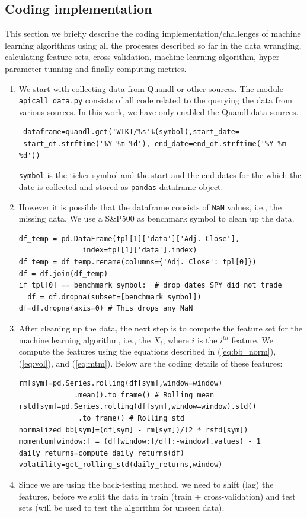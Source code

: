 \documentclass[12pt]{article}
\begin{document}
\begin{itemize}
\subsection{Coding implementation}
\label{sec:coding}

This section we briefly describe the coding implementation/challenges of machine learning algorithms using all the processes described so far in the data wrangling, calculating feature sets,  cross-validation, machine-learning algorithm, hyper-parameter tunning and finally computing metrics.

\begin{enumerate}
\item We start with collecting data from Quandl  or other sources. The module \\
\texttt{apicall\_data.py} consists of all code related to the querying the data from various sources. In this work, we have only enabled the Quandl data-sources. 


\begin{verbatim}
 dataframe=quandl.get('WIKI/%s'%(symbol),start_date=
 start_dt.strftime('%Y-%m-%d'), end_date=end_dt.strftime('%Y-%m-%d'))
\end{verbatim}


\texttt{symbol} is the ticker symbol and the start and the end dates for the which the date is collected and stored as \texttt{pandas} dataframe object.
\item However it is possible that the dataframe consists of \texttt{NaN} values, i.e., the missing data. We use a S\&P500 as benchmark symbol to clean up the data.

\begin{verbatim}
df_temp = pd.DataFrame(tpl[1]['data']['Adj. Close'],
               index=tpl[1]['data'].index)
df_temp = df_temp.rename(columns={'Adj. Close': tpl[0]}) 
df = df.join(df_temp)
if tpl[0] == benchmark_symbol:  # drop dates SPY did not trade
  df = df.dropna(subset=[benchmark_symbol])
df=df.dropna(axis=0) # This drops any NaN 
\end{verbatim}
\item After cleaning up the data, the next step is to compute the feature set for the machine learning algorithm, i.e., the $X_i$, where $i$ is the $i^{th}$ feature. We compute the features using the equations described in (\ref{eq:bb_norm}),  (\ref{eq:vol}), and  (\ref{eq:mtm}). Below are the coding details of these features:

\begin{verbatim}
rm[sym]=pd.Series.rolling(df[sym],window=window)
             .mean().to_frame() # Rolling mean
rstd[sym]=pd.Series.rolling(df[sym],window=window).std()
              .to_frame() # Rolling std
normalized_bb[sym]=(df[sym] - rm[sym])/(2 * rstd[sym])
momentum[window:] = (df[window:]/df[:-window].values) - 1
daily_returns=compute_daily_returns(df)
volatility=get_rolling_std(daily_returns,window)
\end{verbatim}
\item Since we are using the back-testing method, we need to shift (lag) the features, before we split the data in train (train + cross-validation) and test sets (will be used to test the algorithm for unseen data).


\end{enumerate}
\end{itemize}
\end{document}
